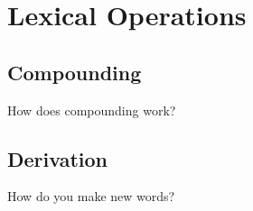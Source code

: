 \chapter{Lexical Operations}
\label{cha:tvk-lex-operations}

\section{Compounding}
\label{sec:tvk-lex-compounding}

How does compounding work?

\section{Derivation}
\label{sec:tvk-lex-derivation}

How do you make new words?